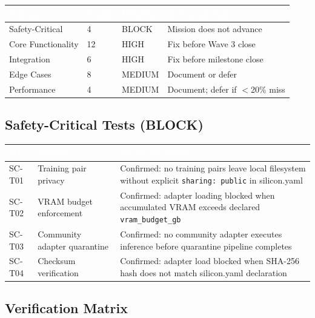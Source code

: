 \documentclass[11pt,letterpaper]{article}
\newcommand{\tableheader}[1]{\textbf{\sffamily\textcolor{white}{#1}}}
\begin{document}
\begin{center}
\begin{tabularx}{\textwidth}{L{3cm}C{1.5cm}L{1.8cm}X}
\toprule
{}
\tableheader{Category} & \tableheader{Count} & \tableheader{Priority} & \tableheader{Action on Fail} \\
\midrule
Safety-Critical & 4 & BLOCK & Mission does not advance \\
Core Functionality & 12 & HIGH & Fix before Wave 3 close \\
Integration & 6 & HIGH & Fix before milestone close \\
Edge Cases & 8 & MEDIUM & Document or defer \\
Performance & 4 & MEDIUM & Document; defer if $<$20\% miss \\
\bottomrule
\end{tabularx}
\end{center}

\subsection{Safety-Critical Tests (BLOCK)}

\begin{center}
\begin{tabularx}{\textwidth}{L{1.5cm}L{3.5cm}X}
\toprule
{}
\tableheader{ID} & \tableheader{Verifies} & \tableheader{Expected Result} \\
\midrule
SC-T01 & Training pair privacy & Confirmed: no training pairs leave local filesystem without explicit \texttt{sharing: public} in silicon.yaml \\
SC-T02 & VRAM budget enforcement & Confirmed: adapter loading blocked when accumulated VRAM exceeds declared \texttt{vram\_budget\_gb} \\
SC-T03 & Community adapter quarantine & Confirmed: no community adapter executes inference before quarantine pipeline completes \\
SC-T04 & Checksum verification & Confirmed: adapter load blocked when SHA-256 hash does not match silicon.yaml declaration \\
\bottomrule
\end{tabularx}
\end{center}

\subsection{Verification Matrix}
\end{document}
